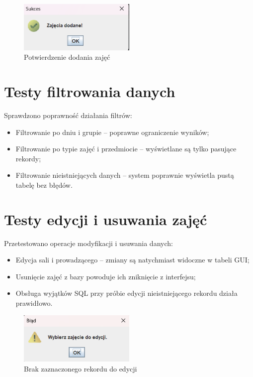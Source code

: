 \begin{figure}[H]
\centering
\includegraphics[width=0.5\textwidth]{figures/approve/add_zajecia_succesfull.png}
\caption{Potwierdzenie dodania zajęć}
\end{figure}

\section{Testy filtrowania danych}

Sprawdzono poprawność działania filtrów:

\begin{itemize}
    \item Filtrowanie po dniu i grupie – poprawne ograniczenie wyników;
    \item Filtrowanie po typie zajęć i przedmiocie – wyświetlane są tylko pasujące rekordy;
    \item Filtrowanie nieistniejących danych – system poprawnie wyświetla pustą tabelę bez błędów.
\end{itemize}

\section{Testy edycji i usuwania zajęć}

Przetestowano operacje modyfikacji i usuwania danych:

\begin{itemize}
    \item Edycja sali i prowadzącego – zmiany są natychmiast widoczne w tabeli GUI;
    \item Usunięcie zajęć z bazy powoduje ich zniknięcie z interfejsu;
    \item Obsługa wyjątków SQL przy próbie edycji nieistniejącego rekordu działa prawidłowo.
\end{itemize}

\begin{figure}[H]
\centering
\includegraphics[width=0.5\textwidth]{figures/Warning/select_zajecia_to_edit.png}
\caption{Brak zaznaczonego rekordu do edycji}
\end{figure}

